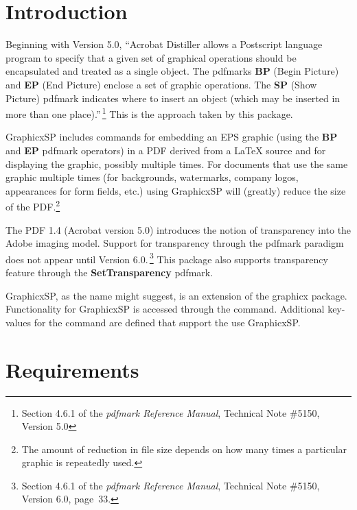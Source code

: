 \documentclass{article}
\let\pkg\textsf
\begin{document}
\maketitle

\tableofcontents
{}

\section{Introduction}

Beginning with Version 5.0, ``Acrobat Distiller allows a Postscript
language program to specify that a given set of graphical operations
should be encapsulated and treated as a single object. The pdfmarks
\textbf{BP} (Begin Picture) and \textbf{EP} (End Picture) enclose a
set of graphic operations. The \textbf{SP} (Show Picture) pdfmark
indicates where to insert an object (which may be inserted in more
than one place).''\,\footnote{Section 4.6.1 of the \textit{pdfmark
Reference Manual}, Technical Note \#5150, Version 5.0} This is the
approach taken by this package.

\pkg{GraphicxSP} includes commands for embedding an EPS graphic (using the
\textbf{BP} and \textbf{EP} pdfmark operators) in a PDF derived from
a {\LaTeX} source and for displaying the graphic, possibly multiple
times. For documents that use the same graphic multiple times (for
backgrounds, watermarks, company logos, appearances for form fields,
etc.) using \pkg{GraphicxSP} will (greatly) reduce the size of the
PDF.\footnote{The amount of reduction in file size depends on how
many times a particular graphic is repeatedly used.}

The PDF 1.4 (Acrobat version 5.0) introduces the notion of
transparency into the Adobe imaging model. Support for transparency
through the pdfmark paradigm does not appear until Version
6.0.\,\footnote{Section 4.6.1 of the \textit{pdfmark Reference
Manual}, Technical Note \#5150, Version 6.0, page~33.} This package
also supports transparency feature through the
\textbf{SetTransparency} pdfmark.

\pkg{GraphicxSP}, as the name might suggest, is an extension of the
graphicx package. Functionality for \pkg{GraphicxSP} is accessed through
the  command. Additional key-values for the
 command are defined that support the use
\pkg{GraphicxSP}.

\section{Requirements}
\end{document}
